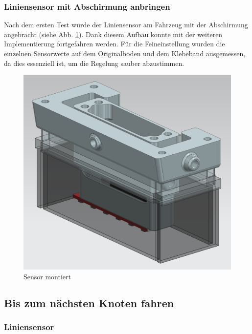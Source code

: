 \subsubsection{Liniensensor mit Abschirmung anbringen}

Nach dem ersten Test wurde der Liniensensor am Fahrzeug mit der Abschirmung angebracht (siehe Abb. \ref{fig:enter-label}). Dank diesem Aufbau konnte mit der weiteren Implementierung fortgefahren werden. Für die Feineinstellung wurden die einzelnen Sensorwerte auf dem Originalboden und dem Klebeband ausgemessen, da dies essenziell ist, um die Regelung sauber abzustimmen.


\begin{figure}[H]
    \centering
    \includegraphics[width=0.5\linewidth]{Sensor montiert.png}
    \caption{Sensor montiert}
    \label{fig:enter-label}
\end{figure}


\newpage

\subsection{Bis zum nächsten Knoten fahren}

\subsubsection{Liniensensor}

